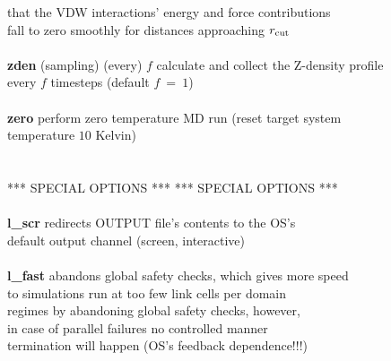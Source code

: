 \begin{tabbing}
\>                                              \> that the VDW interactions' energy and force contributions \\
\>                                              \> fall to zero smoothly for distances approaching $r_{\rm cut}$ \\
\>                                              \> \\
\> {\bf zden} (sampling) (every) $f$            \> calculate and collect the Z-density profile \\
\>                                              \> every $f$ timesteps (default $f~=~1$) \\
\>                                              \> \\
\> {\bf zero}                                   \> perform zero temperature MD run (reset target system \\
\>                                              \> temperature $10$ Kelvin) \\
\>                                              \> \\
\>                                              \> \\
\> *** SPECIAL OPTIONS ***                      \> *** SPECIAL OPTIONS *** \\
\>                                              \> \\
\> {\bf l\_scr}                                 \> redirects OUTPUT file's contents to the OS's \\
\>                                              \> default output channel (screen, interactive) \\
\>                                              \> \\
\> {\bf l\_fast}                                \> abandons global safety checks, which gives more speed \\
\>                                              \> to simulations run at too few link cells per domain \\
\>                                              \> regimes by abandoning global safety checks, however, \\
\>                                              \> in case of parallel failures no controlled manner \\
\>                                              \> termination will happen (OS's feedback dependence!!!) \\
\>                                              \> \\

\end{tabbing}
